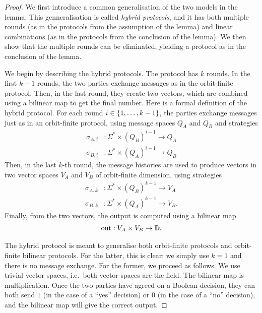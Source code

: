 \begin{proof}
    We first introduce a common generalisation of the two models in the lemma. This genneralisation is called \emph{hybrid protocols}, and it has both multiple rounds (as in the protocols from the assumption of the lemma) and linear combinations (as in the protocols from the  conclusion of the lemma). We then show that the multiple rounds can be eliminated, yielding a protocol as in the conclusion of the lemma. 

    We begin by describing the hybrid protocols. The protocol has $k$ rounds.  In the first $k-1$ rounds, the two parties exchange messages as in the orbit-finite protocol. Then, in the last round, they create two vectors, which are combined using a bilinear map to get the final number. 
    Here is a formal definition of the hybrid protocol. For each round $i \in \{1,\ldots,k-1\}$, the parties exchange messages just as in an orbit-finite protocol, using message spaces $Q_A$ and $Q_B$ and strategies 
        \begin{align*}
        \sigma_{A,i} & : \Sigma^* \times (Q_B)^{i-1} \to Q_A\\
        \sigma_{B,i} & : \Sigma^* \times (Q_A)^{i-1} \to Q_B
        \end{align*}
    Then, in  the last $k$-th round, the message histories are used to produce vectors in two vector spaces $V_A$ and $V_B$ of orbit-finite dimension, using strategies 
    \begin{align*}
        \sigma_{A,k} & : \Sigma^* \times (Q_B)^{k-1} \to V_A\\
        \sigma_{B,k} & : \Sigma^* \times (Q_A)^{k-1} \to V_B.
        \end{align*}
    Finally, from the two vectors, the output is computed using a bilinear map
    \begin{align*}
        \text{out} : V_A \times V_B \to \mathbb D.
    \end{align*}
    

    The hybrid protocol is meant to generalise both orbit-finite protocols and orbit-finite bilinear protocols. For the latter, this is clear: we simply use $k=1$ and there is no message exchange. For the former, we proceed as follows. We use  trivial vector spaces, i.e.~both vector spaces are the field. The bilinear map is multiplication. Once the two parties have agreed on a Boolean decision, they can both send $1$ (in the case of a ``yes'' decision) or $0$ (in the case of a ``no'' decision), and the bilinear map will give the correct output. 
    

\end{proof}
